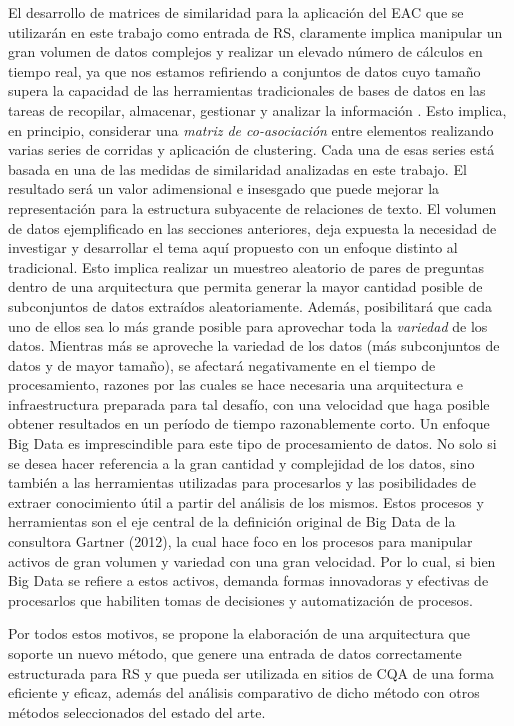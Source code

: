 \bigskip El desarrollo de matrices de similaridad para la aplicación del EAC que se utilizarán en este trabajo como entrada de RS, claramente implica manipular un gran volumen de datos complejos y realizar un elevado número de cálculos en tiempo real, ya que nos estamos refiriendo a conjuntos de datos cuyo tamaño supera la capacidad de las herramientas tradicionales de bases de datos en las tareas de recopilar, almacenar, gestionar y analizar la información \citep{de2016mineria}. Esto implica, en principio, considerar una \textit{matriz de co-asociación} entre elementos realizando varias series de corridas y aplicación de clustering. Cada una de esas series está basada en una de las medidas de similaridad analizadas en este trabajo. El resultado será un valor adimensional e insesgado que puede mejorar la representación para la estructura subyacente de relaciones de texto. El volumen de datos ejemplificado en las secciones anteriores, deja expuesta la necesidad de investigar y desarrollar el tema aquí propuesto con un enfoque distinto al tradicional. Esto implica realizar un muestreo aleatorio de pares de preguntas dentro de una arquitectura que permita generar la mayor cantidad posible de subconjuntos de datos extraídos aleatoriamente. Además, posibilitará que cada uno de ellos sea lo más grande posible para aprovechar toda la \textit{variedad} de los datos. Mientras más se aproveche la variedad de los datos (más subconjuntos de datos y de mayor tamaño), se afectará negativamente en el tiempo de procesamiento, razones por las cuales se hace necesaria una arquitectura e infraestructura preparada para tal desafío, con una velocidad que haga posible obtener resultados en un período de tiempo razonablemente corto. Un enfoque Big Data es imprescindible para este tipo de procesamiento de datos. No solo si se desea hacer referencia a la gran cantidad y complejidad de los datos, sino también a las herramientas utilizadas para procesarlos y las posibilidades de extraer conocimiento útil a partir del análisis de los mismos. Estos procesos y herramientas son el eje central de la definición original de Big Data de la consultora Gartner (2012), la cual hace foco en los procesos para manipular activos de gran volumen y variedad con una gran velocidad. Por lo cual, si bien Big Data se refiere a estos activos, demanda formas innovadoras y efectivas de procesarlos que habiliten tomas de decisiones y automatización de procesos.

\bigskip Por todos estos motivos, se propone la elaboración de una arquitectura que soporte un nuevo método, que genere una entrada de datos correctamente estructurada para RS y que pueda ser utilizada en sitios de CQA de una forma eficiente y eficaz, además del análisis comparativo de dicho método con otros métodos seleccionados del estado del arte.

